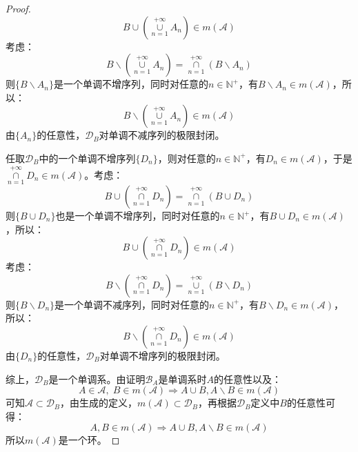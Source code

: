 \begin{proof}
	\begin{equation*}
		B\cup\left(\underset{n=1}{\overset{+\infty}{\cup}}A_n\right)\in m(\mathscr{A})
	\end{equation*}
	考虑：
	\begin{equation*}
		B\backslash\left(\underset{n=1}{\overset{+\infty}{\cup}}A_n\right)
		=\underset{n=1}{\overset{+\infty}{\cap}}(B\backslash A_n)
	\end{equation*}
	则$\{B\backslash A_n\}$是一个单调不增序列，同时对任意的$n\in\mathbb{N}^+$，有$B\backslash A_n\in m(\mathscr{A})$，所以：
	\begin{equation*}
		B\backslash\left(\underset{n=1}{\overset{+\infty}{\cup}}A_n\right)\in m(\mathscr{A})
	\end{equation*}
	由$\{A_n\}$的任意性，$\mathscr{D}_B$对单调不减序列的极限封闭。\par
	任取$\mathscr{D}_B$中的一个单调不增序列$\{D_n\}$，则对任意的$n\in\mathbb{N}^+$，有$D_n\in m(\mathscr{A})$，于是$\underset{n=1}{\overset{+\infty}{\cap}}D_n\in m(\mathscr{A})$。考虑：
	\begin{equation*}
		B\cup \left(\underset{n=1}{\overset{+\infty}{\cap}}D_n\right)
		=\underset{n=1}{\overset{+\infty}{\cap}}(B\cup D_n)
	\end{equation*}
	则$\{B\cup D_n\}$也是一个单调不增序列，同时对任意的$n\in\mathbb{N}^+$，有$B\cup D_n\in m(\mathscr{A})$，所以：
	\begin{equation*}
		B\cup\left(\underset{n=1}{\overset{+\infty}{\cap}}D_n\right)\in m(\mathscr{A})
	\end{equation*}
	考虑：
	\begin{equation*}
		B\backslash\left(\underset{n=1}{\overset{+\infty}{\cap}}D_n\right)
		=\underset{n=1}{\overset{+\infty}{\cup}}(B\backslash D_n)
	\end{equation*}
	则$\{B\backslash D_n\}$是一个单调不减序列，同时对任意的$n\in\mathbb{N}^+$，有$B\backslash D_n\in m(\mathscr{A})$，所以：
	\begin{equation*}
		B\backslash\left(\underset{n=1}{\overset{+\infty}{\cap}}D_n\right)\in m(\mathscr{A})
	\end{equation*}
	由$\{D_n\}$的任意性，$\mathscr{D}_B$对单调不增序列的极限封闭。\par
	综上，$\mathscr{D}_B$是一个单调系。由证明$\mathscr{B}_A$是单调系时$A$的任意性以及：
	\begin{equation*}
		A\in \mathscr{A},\;B\in m(\mathscr{A})\Rightarrow A\cup B,A\backslash B\in m(\mathscr{A})
	\end{equation*}
	可知$\mathscr{A}\subset \mathscr{D}_B$，由生成的定义，$m(\mathscr{A})\subset \mathscr{D}_B$，再根据$\mathscr{D}_B$定义中$B$的任意性可得：
	\begin{equation*}
		A,B\in m(\mathscr{A})\Rightarrow A\cup B,A\backslash B\in m(\mathscr{A})
	\end{equation*}
	所以$m(\mathscr{A})$是一个环。
\end{proof}
